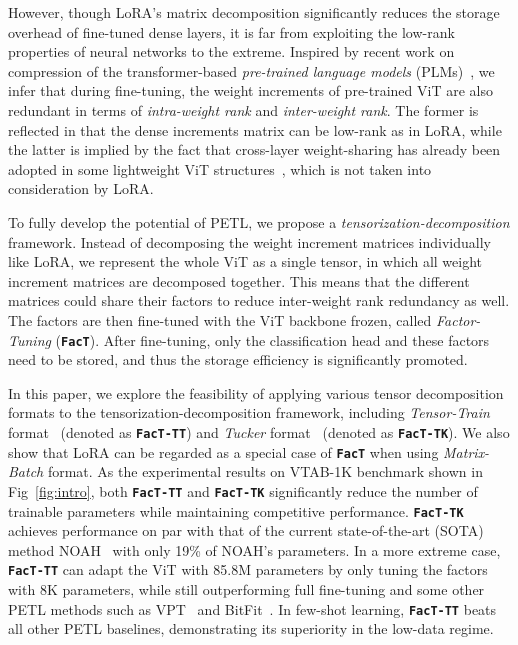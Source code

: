 However, though LoRA's matrix decomposition significantly reduces the storage overhead of fine-tuned dense layers, it is far from exploiting the low-rank properties of neural networks to the extreme. Inspired by recent work on compression of the transformer-based \emph{pre-trained language models} (PLMs)~\cite{inter2}, we infer that during fine-tuning, the weight increments of pre-trained ViT are also redundant in terms of \emph{intra-weight rank} and \emph{inter-weight rank}. The former is reflected in that the dense increments matrix can be low-rank as in LoRA, while the latter is implied by the fact that cross-layer weight-sharing has already been adopted in some lightweight ViT structures~\cite{minivit}, which is not taken into consideration by LoRA. 

To fully develop the potential of PETL, we propose a \emph{tensorization-decomposition} framework. Instead of decomposing the weight increment matrices individually like LoRA, we represent the whole ViT as a single tensor, in which all weight increment matrices are decomposed together. This means that the different matrices could share their factors to reduce inter-weight rank redundancy as well. The factors are then fine-tuned with the ViT backbone frozen, called \emph{Factor-Tuning} (\texttt{\textbf{FacT}}). After fine-tuning, only the classification head and these factors need to be stored, and thus the storage efficiency is significantly promoted.

In this paper, we explore the feasibility of applying various tensor decomposition formats to the tensorization-decomposition framework, including \emph{Tensor-Train} format~\cite{tt} (denoted as \texttt{\textbf{FacT-TT}}) and \emph{Tucker} format~\cite{tucker} (denoted as \texttt{\textbf{FacT-TK}}). We also show that LoRA can be regarded as a special case of \texttt{\textbf{FacT}} when using \emph{Matrix-Batch} format. As the experimental results on VTAB-1K benchmark shown in Fig~\ref{fig:intro}, both \texttt{\textbf{FacT-TT}} and \texttt{\textbf{FacT-TK}} significantly reduce the number of trainable parameters while maintaining competitive performance. \texttt{\textbf{FacT-TK}} achieves performance on par with that of the current state-of-the-art (SOTA) method NOAH~\cite{noah} with only 19\% of NOAH's parameters. In a more extreme case, \texttt{\textbf{FacT-TT}} can adapt the ViT with 85.8M parameters by only tuning the factors with 8K parameters, while still outperforming full fine-tuning and some other PETL methods such as VPT~\cite{vpt} and BitFit~\cite{bitfit}. In few-shot learning, \texttt{\textbf{FacT-TT}} beats all other PETL baselines, demonstrating its superiority in the low-data regime. 

